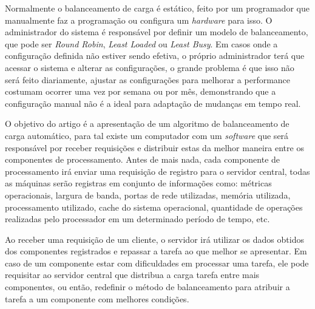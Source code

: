 	Normalmente o balanceamento de carga é estático, feito por um programador que manualmente faz a programação ou configura um \textit{hardware} para isso. O administrador do sistema é responsável por definir um modelo de balanceamento, que pode ser \textit{Round Robin}, \textit{Least Loaded} ou \textit{Least Busy}. Em casos onde a configuração definida não estiver sendo efetiva, o próprio administrador terá que acessar o sistema e alterar as configurações, o grande problema é que isso não será feito diariamente, ajustar as configurações para melhorar a performance costumam ocorrer uma vez por semana ou por mês, demonstrando que a configuração manual não é a ideal para adaptação de mudanças em tempo real.
	
	O objetivo do artigo é a apresentação de um algoritmo de balanceamento de carga automático, para tal existe um computador com um \textit{software} que será responsável por receber requisições e distribuir estas da melhor maneira entre os componentes de processamento. Antes de mais nada, cada componente de processamento irá enviar uma requisição de registro para o servidor central, todas as máquinas serão registras em conjunto de informações como: métricas operacionais, largura de banda, portas de rede utilizadas, memória utilizada, processamento utilizado, cache do sistema operacional, quantidade de operações realizadas pelo processador em um determinado período de tempo, etc.
	
	Ao receber uma requisição de um cliente, o servidor irá utilizar os dados obtidos dos componentes registrados e repassar a tarefa ao que melhor se apresentar. Em caso de um componente estar com dificuldades em processar uma tarefa, ele pode requisitar ao servidor central que distribua a carga tarefa entre mais componentes, ou então, redefinir o método de balanceamento para atribuir a tarefa a um componente com melhores condições.
	
	
	
